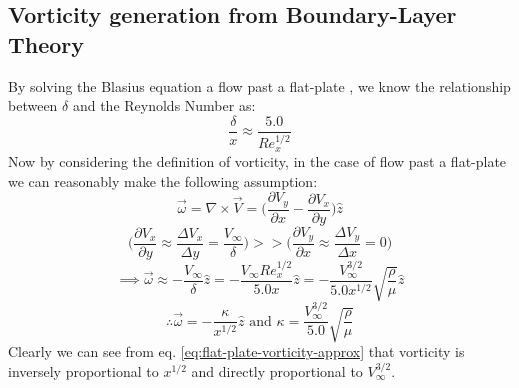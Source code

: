 \subsection{Vorticity generation from Boundary-Layer Theory}
By solving the Blasius equation a flow past a flat-plate \parencite{White2018-ai}, we know the relationship between $\delta$ and the Reynolds Number as:
\begin{equation}
	\frac{\delta}{x} \approx \frac{5.0}{Re_x^{1/2}}
\end{equation}
Now by considering the definition of vorticity, in the case of flow past a flat-plate we can reasonably make the following assumption:
\begin{equation}
	\vec{\omega} = \nabla \times \vec{V} = \bigg( \frac{\partial V_y}{\partial x} - \frac{\partial V_x}{\partial y} \bigg) \hat{z}
\end{equation}
\begin{equation}
	\Bigg(\frac{\partial V_x}{\partial y} \approx \frac{\Delta V_x}{\Delta y} = \frac{V_{\infty}}{\delta} \Bigg) >> \Bigg(\frac{\partial V_y}{\partial x}  \approx \frac{\Delta V_y}{\Delta x} = 0 \Bigg)
\end{equation}
\begin{equation}
	\implies \vec{\omega} \approx - \frac{V_{\infty}}{\delta} \hat{z} = -\frac{V_{\infty} Re_x^{1/2}}{5.0 x} \hat{z} = - \frac{V_{\infty}^{3/2}}{5.0 x^{1/2}}\sqrt{\frac{\rho}{\mu}} \hat{z}
\end{equation}
\begin{equation}
	\therefore \vec{\omega} = - \frac{\kappa}{x^{1/2}}\hat{z} \text{ and } \kappa = \frac{V_{\infty}^{3/2}}{5.0}\sqrt{\frac{\rho}{\mu}}
	\label{eq:flat-plate-vorticity-approx}
\end{equation}
Clearly we can see from eq. \ref{eq:flat-plate-vorticity-approx} that vorticity is inversely proportional to $x^{1/2}$ and directly proportional  to $V_{\infty}^{3/2}$.


